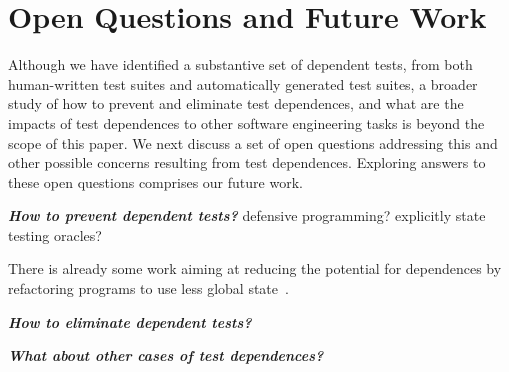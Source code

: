 \section{Open Questions and Future Work}
\label{sec:discussion}



Although we have identified a substantive set of dependent
tests, from both human-written test suites and
automatically generated test suites, a broader
study of how to prevent and eliminate test dependences, and
what are the impacts of test dependences to other software engineering
tasks is beyond the scope of this paper. 
We next discuss a set of open questions addressing this and
other possible concerns resulting from test dependences. 
Exploring answers to these open questions comprises
our future work.




\vspace{1mm}

\noindent \textbf{\textit{How to prevent dependent tests?}}
defensive programming? explicitly state testing oracles?

There is already some work aiming at
reducing the potential for dependences by refactoring programs to use
less global state~\cite{wlokaetal:FSE:2009}. 

\vspace{1mm}

\noindent \textbf{\textit{How to eliminate dependent tests?}}


\vspace{1mm}

\noindent \textbf{\textit{What about other cases of test dependences?}}





